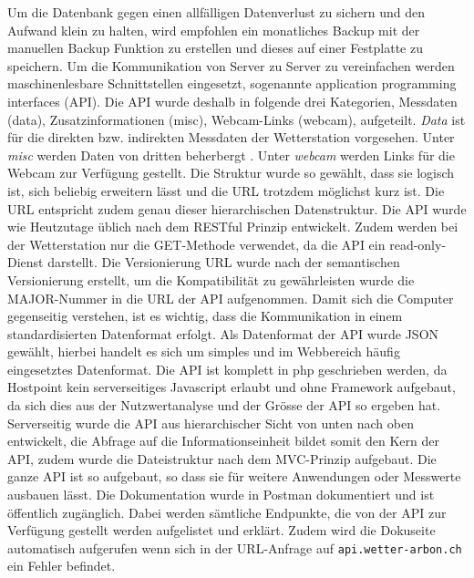 \documentclass[10pt]{article}
\begin{document}
\begin{multicols}{2}
Um die Datenbank gegen einen allfälligen Datenverlust zu sichern und den Aufwand klein zu halten, wird empfohlen ein monatliches Backup mit der manuellen Backup Funktion zu erstellen und dieses auf einer Festplatte zu speichern.
Um die Kommunikation von Server zu Server zu vereinfachen werden maschinenlesbare Schnittstellen eingesetzt, sogenannte application programming interfaces (API). Die API wurde deshalb in folgende drei Kategorien, Messdaten (data), Zusatzinformationen (misc), Webcam-Links (webcam), aufgeteilt. \emph{Data} ist für die direkten bzw. indirekten Messdaten der Wetterstation vorgesehen. Unter \emph{misc} werden Daten von dritten beherbergt . Unter \emph{webcam} werden Links für die Webcam zur Verfügung gestellt. Die Struktur wurde so gewählt, dass sie logisch ist, sich beliebig erweitern lässt und die URL trotzdem möglichst kurz ist. Die URL entspricht zudem genau dieser hierarchischen Datenstruktur. Die API wurde wie Heutzutage üblich nach dem RESTful Prinzip entwickelt. Zudem werden bei der Wetterstation nur die GET-Methode verwendet, da die API ein read-only-Dienst darstellt. Die Versionierung URL wurde nach der semantischen Versionierung erstellt, um die Kompatibilität zu gewährleisten wurde die MAJOR-Nummer in die URL der API aufgenommen. Damit sich die Computer gegenseitig verstehen, ist es wichtig, dass die Kommunikation in einem standardisierten Datenformat erfolgt. Als Datenformat der API wurde JSON gewählt, hierbei handelt es sich um simples und im Webbereich häufig eingesetztes Datenformat. Die API ist komplett in php geschrieben werden, da Hostpoint kein serverseitiges Javascript erlaubt und ohne Framework aufgebaut, da sich dies aus der Nutzwertanalyse und der Grösse der API so ergeben hat. Serverseitig wurde die API aus hierarchischer Sicht von unten nach oben entwickelt, die Abfrage auf die Informationseinheit bildet somit den Kern der API, zudem wurde die Dateistruktur nach dem MVC-Prinzip aufgebaut. Die ganze API ist so aufgebaut, so dass sie für weitere Anwendungen oder Messwerte ausbauen lässt. Die Dokumentation wurde in Postman dokumentiert und ist öffentlich zugänglich. Dabei werden sämtliche Endpunkte, die von der API zur Verfügung gestellt werden aufgelistet und erklärt. Zudem wird die Dokuseite automatisch aufgerufen wenn sich in der URL-Anfrage auf \texttt{api.wetter-arbon.ch} ein Fehler befindet.\\

\end{multicols}
\end{document}
